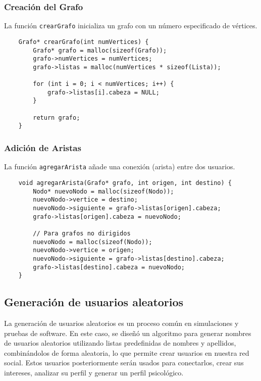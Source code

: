 \documentclass[9pt,letterpaper,onecolumn]{rho-class/rho}
\begin{document}
    \subsubsection{Creación del Grafo}
    La función \texttt{crearGrafo} inicializa un grafo con un número especificado de vértices.

    \begin{verbatim}
    Grafo* crearGrafo(int numVertices) {
        Grafo* grafo = malloc(sizeof(Grafo));
        grafo->numVertices = numVertices;
        grafo->listas = malloc(numVertices * sizeof(Lista));

        for (int i = 0; i < numVertices; i++) {
            grafo->listas[i].cabeza = NULL;
        }

        return grafo;
    }
    \end{verbatim}

    \subsubsection{Adición de Aristas}
    La función \texttt{agregarArista} añade una conexión (arista) entre dos usuarios.

    \begin{verbatim}
    void agregarArista(Grafo* grafo, int origen, int destino) {
        Nodo* nuevoNodo = malloc(sizeof(Nodo));
        nuevoNodo->vertice = destino;
        nuevoNodo->siguiente = grafo->listas[origen].cabeza;
        grafo->listas[origen].cabeza = nuevoNodo;

        // Para grafos no dirigidos
        nuevoNodo = malloc(sizeof(Nodo));
        nuevoNodo->vertice = origen;
        nuevoNodo->siguiente = grafo->listas[destino].cabeza;
        grafo->listas[destino].cabeza = nuevoNodo;
    }
    \end{verbatim}

    \subsection{Generación de usuarios aleatorios}
    La generación de usuarios aleatorios es un proceso común en simulaciones y pruebas de software. 
    En este caso, se diseñó un algoritmo para generar nombres de usuarios aleatorios utilizando listas predefinidas de nombres y apellidos, combinándolos de forma aleatoria, lo que permite crear usuarios en nuestra red social.
    Estos usuarios posteriormente serán usados para conectarlos, crear sus intereses, analizar su perfil y generar un perfil psicológico.
\end{document}
